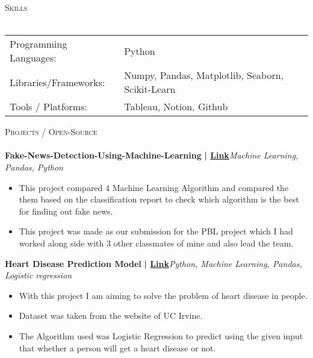 \documentclass[a4paper]{article}
\newcommand{\lineunder} {
    \vspace*{-8pt} \\
    \hspace*{-18pt} \hrulefill \\
}
\newcommand{\header} [1] {
    {\hspace*{-18pt}\vspace*{6pt} \textsc{#1}}
    \vspace*{-6pt} \lineunder
}
\begin{document}
%
%
  \header{Skills}
  \vspace{2mm}
  \begin{longtable}{p{4cm}p{12cm}}
  Programming Languages: & Python \\
  Libraries/Frameworks: & Numpy, Pandas, Matplotlib, Seaborn, Scikit-Learn \\
  Tools / Platforms: & Tableau, Notion, Github \\
  \end{longtable}
  \vspace{1mm}

      \header{Projects / Open-Source}
      \vspace{2mm}
      {\textbf{Fake-News-Detection-Using-Machine-Learning}}\textbf{ | \href{https://github.com/sayampalrecha/Fake-News-Detection-Using-Machine-Learning}{Link}}\hfill{\sl Machine Learning, Pandas, Python}\\
          \vspace{-3mm}
\begin{itemize} \itemsep -3pt
\item  This project compared 4 Machine Learning Algorithm and compared the them based on the classification report to check which algorithm is the best for finding out fake news.
\item  This project was made as our submission for the PBL project which I had worked along side with 3 other classmates of mine and also lead the team.
\end{itemize}
          \vspace*{3mm}
      {\textbf{Heart Disease Prediction Model}}\textbf{ | \href{https://github.com/sayampalrecha/Heart\_Disease\_Model}{Link}}\hfill{\sl Python, Machine Learning, Pandas, Logistic regression}\\
          \vspace{-3mm}
\begin{itemize} \itemsep -3pt
\item  With this project I am aiming to solve the problem of heart disease in people.
\item  Dataset was taken from the website of UC Irvine.
\item  The Algorithm used was Logistic Regression to predict using the given input that whether a person will get a heart disease or not.
\end{itemize}
\end{document}
